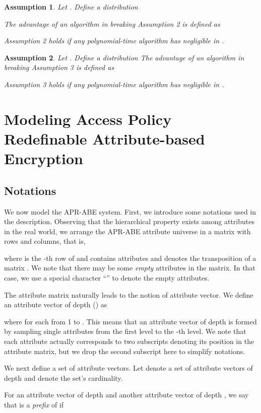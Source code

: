 \documentclass[twocolumn]{svjour3}          \smartqed  \usepackage{graphicx}
\newtheorem{assumption}{Assumption}
\begin{document}
\begin{assumption}
Let . Define a distribution


The advantage of an algorithm  in breaking Assumption 2 is defined as

Assumption 2 holds if any polynomial-time algorithm  has  negligible in .
\end{assumption}


\begin{assumption} Let . Define a distribution
  The advantage of an algorithm  in breaking Assumption 3 is defined as

Assumption 3 holds if any polynomial-time algorithm  has  negligible in .
\end{assumption}


\section{Modeling Access Policy Redefinable Attribute-based Encryption}
\label{model}
\subsection{Notations}
We now model the APR-ABE system. First, we introduce some notations used in the description.
Observing that the hierarchical property exists among attributes in the real world, we arrange the APR-ABE attribute universe  in a matrix with  rows and  columns, that is,

where  is the -th row of  and contains  attributes and  denotes the transposition of a matrix . We note that there may be some {\em empty} attributes in the matrix. In that case, we use a special character ``'' to denote the empty attributes.

The attribute matrix naturally leads to the notion of attribute vector. We define an attribute vector of depth  () as

where  for each  from 1 to . This means that an attribute vector of depth  is formed by sampling single attributes from the first level to the -th level. We note that each attribute  actually corresponds to two subscripts  denoting its position in the attribute matrix, but we drop the second subscript  here to simplify notations.

We next define a set of attribute vectors. Let  denote a set of attribute vectors of depth  and  denote the set's cardinality.

For an attribute vector  of depth  and another attribute vector  of depth , we say that  is a {\em prefix} of  if
\end{document}

